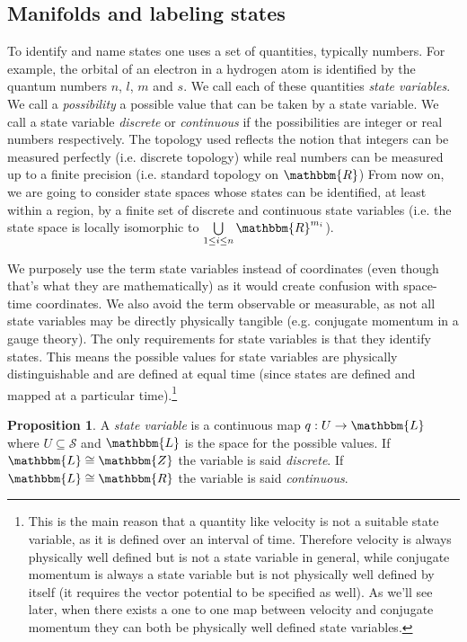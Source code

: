 \documentclass[aps,pra,10pt,twocolumn,floatfix,nofootinbib]{revtex4-1}
\numberwithin{equation}{section}
\theoremstyle{definition}
\newtheorem{prop}[equation]{Proposition}
\begin{document}
\subsection{Manifolds and labeling states}

To identify and name states one uses a set of quantities, typically numbers. For example, the orbital of an electron in a hydrogen atom is identified by the quantum numbers $n$, $l$, $m$ and $s$. We call each of these quantities \emph{state variables}. We call a \emph{possibility} a possible value that can be taken by a state variable. We call a state variable \emph{discrete} or \emph{continuous} if the possibilities are integer or real numbers respectively. The topology used reflects the notion that integers can be measured perfectly (i.e. discrete topology) while real numbers can be measured up to a finite precision (i.e. standard topology on $\mathbbm{R}$) From now on, we are going to consider state spaces whose states can be identified, at least within a region, by a finite set of discrete and continuous state variables (i.e. the state space is locally isomorphic to $\bigcup\limits_{1 \leq i \leq n} \mathbbm{R}^{m_i}$).

We purposely use the term state variables instead of coordinates (even though that's what they are mathematically) as it would create confusion with space-time coordinates. We also avoid the term observable or measurable, as not all state variables may be directly physically tangible (e.g. conjugate momentum in a gauge theory). The only requirements for state variables is that they identify states. This means the possible values for state variables are physically distinguishable and are defined at equal time (since states are defined and mapped at a particular time).\footnote{This is the main reason that a quantity like velocity is not a suitable state variable, as it is  defined over an interval of time. Therefore velocity is always physically well defined but is not a state variable in general, while conjugate momentum is always a state variable but is not physically well defined by itself (it requires the vector potential to be specified as well). As we'll see later, when there exists a one to one map between velocity and conjugate momentum they can both be physically well defined state variables.}

\begin{prop}\label{prop:state_variable}
	A \emph{state variable} is a continuous map $q : U \rightarrow \mathbbm{L}$ where $U \subseteq \mathcal{S}$ and $\mathbbm{L}$ is the space for the possible values. If $\mathbbm{L}\cong \mathbbm{Z}$ the variable is said \emph{discrete}. If $\mathbbm{L}\cong \mathbbm{R}$ the variable is said \emph{continuous}.
\end{prop}
\end{document}
